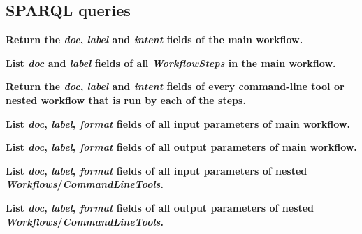 \subsection{SPARQL queries}

\noindent
\textbf{Return the \emph{doc}, \emph{label} and \emph{intent} fields of the main workflow.}



\noindent
\textbf{List \emph{doc} and \emph{label} fields of all \emph{WorkflowSteps} in the main workflow.}




\noindent
\textbf{Return the \emph{doc}, \emph{label} and \emph{intent} fields of every command-line tool or nested workflow that is run by each of the steps.}



\noindent
\textbf{List \emph{doc}, \emph{label}, \emph{format} fields of all input parameters of main workflow.}



\noindent
\textbf{List \emph{doc}, \emph{label}, \emph{format} fields of all output parameters of main workflow.}



\noindent
\textbf{List \emph{doc}, \emph{label}, \emph{format} fields of all input parameters of nested \emph{Workflows}/\emph{CommandLineTools}.}



\noindent
\textbf{List \emph{doc}, \emph{label}, \emph{format} fields of all output parameters of nested \emph{Workflows}/\emph{CommandLineTools}.}


